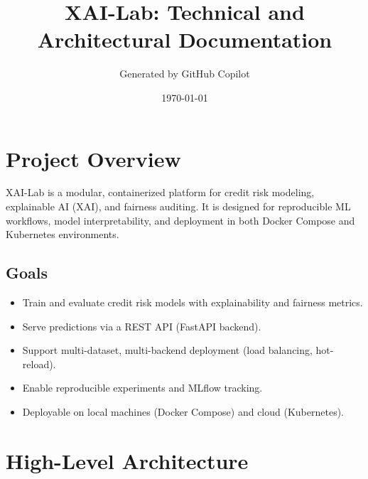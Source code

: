 \documentclass[11pt]{article}
\title{\textbf{XAI-Lab: Technical and Architectural Documentation}}
\author{Generated by GitHub Copilot}
\date{\today}
\begin{document}
\maketitle

\tableofcontents
\newpage

\section{Project Overview}
XAI-Lab is a modular, containerized platform for credit risk modeling, explainable AI (XAI), and fairness auditing. It is designed for reproducible ML workflows, model interpretability, and deployment in both Docker Compose and Kubernetes environments.

\subsection{Goals}
\begin{itemize}
  \item Train and evaluate credit risk models with explainability and fairness metrics.
  \item Serve predictions via a REST API (FastAPI backend).
  \item Support multi-dataset, multi-backend deployment (load balancing, hot-reload).
  \item Enable reproducible experiments and MLflow tracking.
  \item Deployable on local machines (Docker Compose) and cloud (Kubernetes).
\end{itemize}

\section{High-Level Architecture}
\end{document}
